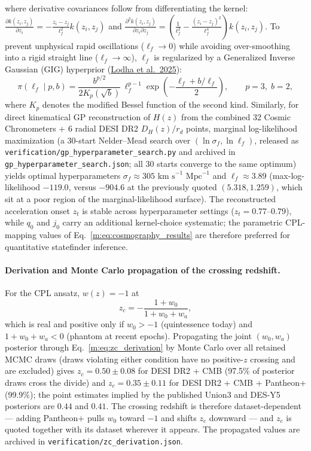 \documentclass[aps,prd,preprint,superscriptaddress,nofootinbib]{revtex4-2}
\begin{document}
where derivative covariances follow from differentiating the kernel: $\frac{\partial k(z_i, z_j)}{\partial z_i} = -\frac{z_i - z_j}{\ell_f^2} k(z_i, z_j)$ and $\frac{\partial^2 k(z_i, z_j)}{\partial z_i \partial z_j} = \left(\frac{1}{\ell_f^2} - \frac{(z_i - z_j)^2}{\ell_f^4}\right) k(z_i, z_j)$. To prevent unphysical rapid oscillations ($\ell_f \to 0$) while avoiding over-smoothing into a rigid straight line ($\ell_f \to \infty$), $\ell_f$ is regularized by a Generalized Inverse Gaussian (GIG) hyperprior (\href{https://arxiv.org/abs/2503.14743}{Lodha et al.\ 2025}):
\begin{equation}
    \pi(\ell_f \mid p, b) = \frac{b^{p/2}}{2 K_p(\sqrt{b})}\, \ell_f^{p-1} \exp\!\left( -\frac{\ell_f + b/\ell_f}{2} \right), \qquad p = 3,\; b = 2,
    \label{m:eq:gig_prior}
\end{equation}
where $K_p$ denotes the modified Bessel function of the second kind. Similarly, for direct kinematical GP reconstruction of $H(z)$ from the combined 32 Cosmic Chronometers + 6 radial DESI DR2 $D_H(z)/r_d$ points, marginal log-likelihood maximization (a 30-start Nelder--Mead search over $(\ln\sigma_f, \ln\ell_f)$, released as \texttt{verification/gp\_hyperparameter\_search.py} and archived in \texttt{gp\_hyperparameter\_search.json}; all 30 starts converge to the same optimum) yields optimal hyperparameters $\sigma_f \approx 305\text{ km s}^{-1}\text{ Mpc}^{-1}$ and $\ell_f \approx 3.89$ (max-log-likelihood $-119.0$, versus $-904.6$ at the previously quoted $(5.318, 1.259)$, which sit at a poor region of the marginal-likelihood surface). The reconstructed acceleration onset $z_t$ is stable across hyperparameter settings ($z_t = 0.77\text{--}0.79$), while $q_0$ and $j_0$ carry an additional kernel-choice systematic; the parametric CPL-mapping values of Eq.~\ref{m:eq:cosmography_results} are therefore preferred for quantitative statefinder inference.

\paragraph{Derivation and Monte Carlo propagation of the crossing redshift.} For the CPL ansatz, $w(z) = -1$ at
\begin{equation}
    z_c = -\frac{1+w_0}{1+w_0+w_a},
    \label{m:eq:zc_derivation}
\end{equation}
which is real and positive only if $w_0 > -1$ (quintessence today) and $1 + w_0 + w_a < 0$ (phantom at recent epochs). Propagating the joint $(w_0, w_a)$ posterior through Eq.~\ref{m:eq:zc_derivation} by Monte Carlo over all retained MCMC draws (draws violating either condition have no positive-$z$ crossing and are excluded) gives $z_c = 0.50 \pm 0.08$ for DESI DR2 + CMB (97.5\% of posterior draws cross the divide) and $z_c = 0.35 \pm 0.11$ for DESI DR2 + CMB + Pantheon+ (99.9\%); the point estimates implied by the published Union3 and DES-Y5 posteriors are $0.44$ and $0.41$. The crossing redshift is therefore dataset-dependent --- adding Pantheon+ pulls $w_0$ toward $-1$ and shifts $z_c$ downward --- and $z_c$ is quoted together with its dataset wherever it appears. The propagated values are archived in \texttt{verification/zc\_derivation.json}.
\end{document}
